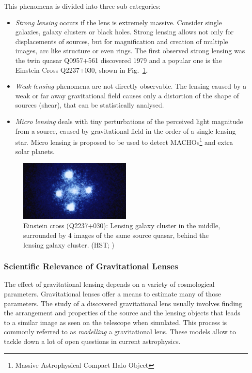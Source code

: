 \documentclass[11pt]{article}
\begin{document}
This phenomena is divided into three sub categories:
\begin{itemize}
  \item
    \emph{Strong lensing} occurs if the lens is extremely massive. Consider single galaxies, galaxy clusters or black holes.
    Strong lensing allows not only for displacements of sources, but for magnification and creation of multiple images, arc like structure or even rings.
    The first observed strong lensing was the twin quasar Q0957+561 discovered 1979\cite{walsh19790957} and a popular one is the Einstein Cross Q2237+030\cite{ec1985}, shown in Fig.~\ref{fig:einsteinc}.
  \item
    \emph{Weak lensing} phenomena are not directly observable.
    The lensing caused by a weak or far away gravitational field causes only a distortion of the shape of sources (shear), that can be statistically analysed.
  \item
    \emph{Micro lensing} deals with tiny perturbations of the perceived light magnitude from a source, caused by gravitational field in the order of a single lensing star.
    Micro lensing is proposed to be used to detect MACHOs\footnote{Massive Astrophysical Compact Halo Object} and extra solar planets.
\end{itemize}

\begin{figure}[h]
	\centering
		\includegraphics[width=0.5\textwidth]{img/einstein_cross}
	\caption{Einstein cross (Q2237+030): Lensing galaxy cluster in the middle, surrounded by 4 images of the same source quasar, behind the lensing galaxy cluster. (HST; \cite{ec1985})}
	\label{fig:einsteinc}
\end{figure}


\subsubsection{Scientific Relevance of Gravitational Lenses}

The effect of gravitational lensing depends on a variety of cosmological parameters.
Gravitational lenses offer a means to estimate many of those parameters.
The study of a discovered gravitational lens usually involves finding the arrangement and properties of the source and the lensing objects that leads to a similar image as seen on the telescope when simulated.
This process is commonly referred to as \emph{modelling} a gravitational lens.
These models allow to tackle down a lot of open questions in current astrophysics.
\end{document}
